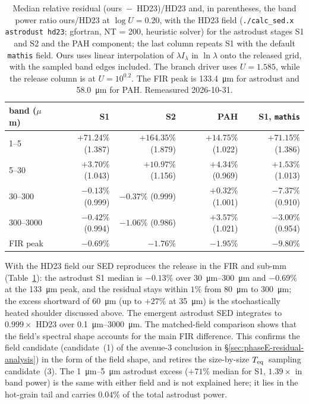 \documentclass{my_memo}
\newcommand{\Teq}{\ensuremath{T_{\rm eq}}}
\begin{document}
\begin{table}[h]
\centering
\begin{tabular}{l r r r r}
\toprule
band ($\mu$m) & S1 & S2 & PAH & S1, \texttt{mathis} \\
\midrule
1--5      & $+71.24\%$ (1.387) & $+164.35\%$ (1.879) & $+14.75\%$ (1.022) & $+71.15\%$ (1.386) \\
5--30     & $+3.70\%$ (1.043)  & $+10.97\%$ (1.156)  & $+4.34\%$ (0.969)  & $+1.53\%$ (1.013) \\
30--300   & $-0.13\%$ (0.999)  & $-0.37\%$ (0.999)   & $+0.32\%$ (1.001)  & $-7.37\%$ (0.910) \\
300--3000 & $-0.42\%$ (0.994)  & $-1.06\%$ (0.986)   & $+3.57\%$ (1.021)  & $-3.00\%$ (0.954) \\
FIR peak  & $-0.69\%$          & $-1.76\%$           & $-1.95\%$          & $-9.80\%$ \\
\bottomrule
\end{tabular}
\caption{Median relative residual (ours~$-$~HD23)/HD23 and, in
parentheses, the band power ratio ours/HD23 at $\log U = 0.20$, with
the HD23 field (\texttt{./calc\_sed.x astrodust hd23}; gfortran,
NT = 200, heuristic solver) for the astrodust stages S1 and S2 and the
PAH component; the last column repeats S1 with the default
\texttt{mathis} field. Ours uses linear interpolation of $\lambda I_\lambda$ in
$\ln\lambda$ onto the released grid, with the sampled band edges
included. The branch driver uses $U=1.585$, while the release
column is at $U=10^{0.2}$. The FIR peak is
\SI{133.4}{\micro\meter} for astrodust and \SI{58.0}{\micro\meter}
for PAH. Remeasured 2026-10-31.}
\label{tab:hd23_bands}
\end{table}

With the HD23 field our SED reproduces the release in the FIR and
sub-mm (Table~\ref{tab:hd23_bands}): the astrodust S1 median is
$-0.13\%$ over \SIrange{30}{300}{\micro\meter} and $-0.69\%$ at the
\SI{133}{\micro\meter} peak, and the residual stays within $1\%$ from
\SI{80}{\micro\meter} to \SI{300}{\micro\meter}; the excess shortward
of \SI{60}{\micro\meter} (up to $+27\%$ at \SI{35}{\micro\meter}) is
the stochastically heated shoulder discussed above. The emergent
astrodust SED integrates to $0.999\times$ HD23 over
\SIrange{0.1}{3000}{\micro\meter}. The matched-field comparison
shows that the field's spectral shape accounts for the main FIR
difference. This confirms the field candidate (candidate~(1) of the
avenue-3 conclusion in \S\ref{sec:phaseE-residual-analysis}) in the
form of the field shape, and retires the size-by-size \Teq\ sampling
candidate~(3). The \SIrange{1}{5}{\micro\meter} astrodust
excess ($+71\%$ median for S1, $1.39\times$ in band power) is the same
with either field and is not explained here; it lies in the
hot-grain tail and carries $0.04\%$ of the total astrodust power.
\end{document}

